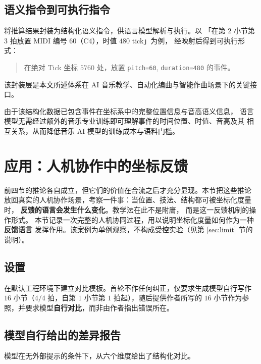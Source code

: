 \documentclass[11pt,a4paper,fontset=none]{ctexart}
\begin{document}
\subsection{语义指令到可执行指令}

将推算结果封装为结构化语义指令，供语言模型解析与执行。以
「在第 $2$ 小节第 $3$ 拍放置 MIDI 编号 $60$（C4），时值 $480$ tick」为例，
经映射后得到可执行形式：
\begin{quote}\small
在绝对 Tick 坐标 $5760$ 处，放置 \texttt{pitch=60}, \texttt{duration=480} 的事件。
\end{quote}
该封装层是本文所述体系在 AI 音乐教学、自动化编曲与智能作曲场景下的关键接口。

由于该结构化数据已包含事件在坐标系中的完整位置信息与音高语义信息，
语言模型无需经过额外的音乐专业训练即可理解事件的时间位置、时值、音高及其
相互关系，从而降低音乐 AI 模型的训练成本与语料门槛。

\section{应用：人机协作中的坐标反馈}
\label{sec:collab}
\label{sec:case}

前四节的推论各自成立，但它们的价值在合流之后才充分显现。本节把这些推论
放回真实的人机协作场景，考察一件事：当位置、技法、结构都可被坐标化度量时，
\textbf{反馈的语言会发生什么变化}。教学法在此不是附庸，
而是这一反馈机制的操作形式。
本节记录一次完整的人机协同过程，用以说明坐标化度量如何作为一种\textbf{反馈语言}
发挥作用。该案例为单例观察，不构成受控实验（见第 \ref{sec:limit} 节的说明）。

\subsection{设置}

在默认工程环境下建立对比模板。首轮不作任何纠正，仅要求生成模型自行写作
$16$ 小节（$4/4$ 拍，自第 $1$ 小节第 $1$ 拍起），随后提供作者所写的
$16$ 小节作为参照，并要求模型\textbf{自行对比}，而非由作者指出错误所在。

\subsection{模型自行给出的差异报告}

模型在无外部提示的条件下，从六个维度给出了结构化对比。
\end{document}
